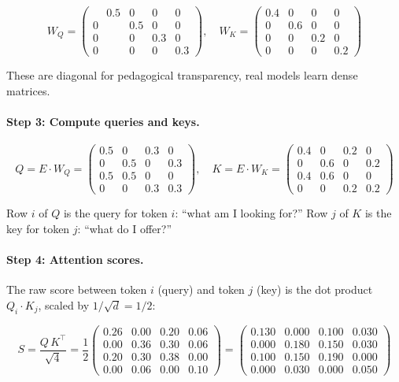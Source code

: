 \documentclass[11pt, a4paper]{article}
\theoremstyle{remark}
\begin{document}
\[
W_Q = \begin{pmatrix}
\phantom{-}0.5 & 0 & 0 & 0 \\
0 & 0.5 & 0 & 0 \\
0 & 0 & 0.3 & 0 \\
0 & 0 & 0 & 0.3
\end{pmatrix},
\quad
W_K = \begin{pmatrix}
0.4 & 0 & 0 & 0 \\
0 & 0.6 & 0 & 0 \\
0 & 0 & 0.2 & 0 \\
0 & 0 & 0 & 0.2
\end{pmatrix}
\]

These are diagonal for pedagogical transparency, real models learn dense matrices.

\paragraph{Step 3: Compute queries and keys.}

\[
Q = E \cdot W_Q = \begin{pmatrix}
0.5 & 0 & 0.3 & 0 \\
0 & 0.5 & 0 & 0.3 \\
0.5 & 0.5 & 0 & 0 \\
0 & 0 & 0.3 & 0.3
\end{pmatrix},
\quad
K = E \cdot W_K = \begin{pmatrix}
0.4 & 0 & 0.2 & 0 \\
0 & 0.6 & 0 & 0.2 \\
0.4 & 0.6 & 0 & 0 \\
0 & 0 & 0.2 & 0.2
\end{pmatrix}
\]

Row $i$ of $Q$ is the query for token $i$: ``what am I looking for?''
Row $j$ of $K$ is the key for token $j$: ``what do I offer?''

\paragraph{Step 4: Attention scores.}
The raw score between token $i$ (query) and token $j$ (key) is the dot product $Q_i \cdot K_j$, scaled by $1/\sqrt{d} = 1/2$:

\[
S = \frac{Q \, K^\top}{\sqrt{4}} = \frac{1}{2}
\begin{pmatrix}
0.26 & 0.00 & 0.20 & 0.06 \\
0.00 & 0.36 & 0.30 & 0.06 \\
0.20 & 0.30 & 0.38 & 0.00 \\
0.00 & 0.06 & 0.00 & 0.10
\end{pmatrix}
=
\begin{pmatrix}
0.130 & 0.000 & 0.100 & 0.030 \\
0.000 & 0.180 & 0.150 & 0.030 \\
0.100 & 0.150 & 0.190 & 0.000 \\
0.000 & 0.030 & 0.000 & 0.050
\end{pmatrix}
\]
\end{document}
